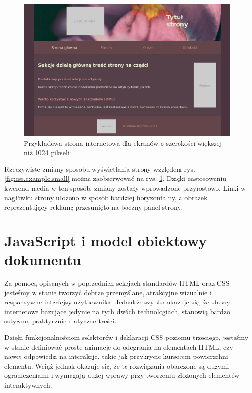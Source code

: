 \begin{figure}[!htbp] 
    \centering
    \includegraphics[width=\textwidth]{img/chapter3/css.example.medium.png}
    \caption{Przykładowa strona internetowa dla ekranów o szerokości większej niż 1024 pikseli}
    \label{fig:css.example.medium}
\end{figure}

Rzeczywiste zmiany sposobu wyświetlania strony względem rys. \ref{fig:css.example.small} można zaobserwować na rys. \ref{fig:css.example.medium}. Dzięki zastosowaniu kwerend media w ten sposób, zmiany zostały wprowadzone przyrostowo. Linki w nagłówku strony ułożono w sposób bardziej horyzontalny, a obrazek reprezentujący reklamę przesunięto na boczny panel strony.

\section{JavaScript i model obiektowy dokumentu}

Za pomocą opisanych w poprzednich sekcjach standardów HTML oraz CSS jesteśmy w stanie tworzyć dobrze przemyślane, atrakcyjne wizualnie i responsywne interfejsy użytkownika. Jednakże szybko okazuje się, że strony internetowe bazujące jedynie na tych dwóch technologiach, stanowią bardzo sztywne, praktycznie statyczne treści.

Dzięki funkcjonalnościom selektorów i deklaracji CSS poziomu trzeciego, jesteśmy w stanie definiować proste animacje do odegrania na elementach HTML, czy nawet odpowiedzi na interakcje, takie jak przykrycie kursorem powierzchni elementu. Wciąż jednak okazuje się, że te rozwiązania obarczone są dużymi ograniczeniami i wymagają dużej wprawy przy tworzeniu złożonych elementów interaktywnych.

